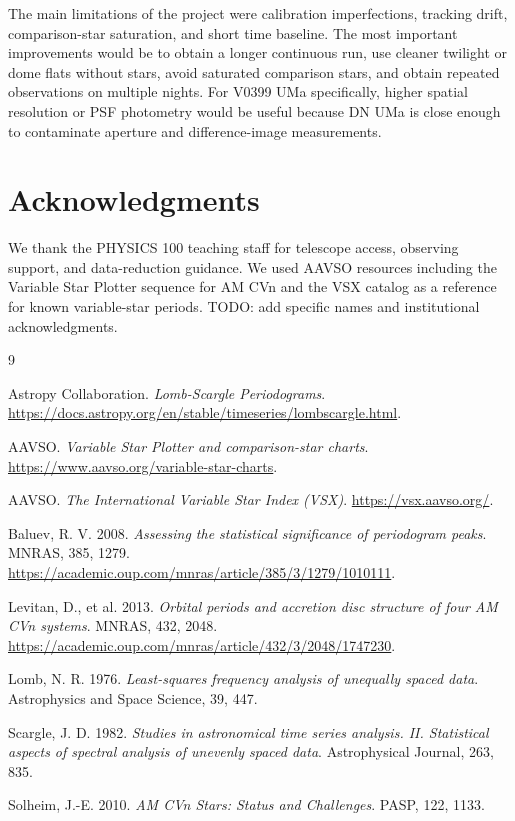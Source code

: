 \documentclass[11pt]{article}
\begin{document}
The main limitations of the project were calibration imperfections, tracking
drift, comparison-star saturation, and short time baseline. The most important
improvements would be to obtain a longer continuous run, use cleaner twilight or
dome flats without stars, avoid saturated comparison stars, and obtain repeated
observations on multiple nights. For V0399 UMa specifically, higher spatial
resolution or PSF photometry would be useful because DN UMa is close enough to
contaminate aperture and difference-image measurements.

\section*{Acknowledgments}

We thank the PHYSICS 100 teaching staff for telescope access, observing support,
and data-reduction guidance. We used AAVSO resources including the Variable Star
Plotter sequence for AM CVn and the VSX catalog as a reference for known
variable-star periods. TODO: add specific names and institutional
acknowledgments.

\begin{thebibliography}{9}

Astropy Collaboration.
\textit{Lomb-Scargle Periodograms}.
\url{https://docs.astropy.org/en/stable/timeseries/lombscargle.html}.

AAVSO.
\textit{Variable Star Plotter and comparison-star charts}.
\url{https://www.aavso.org/variable-star-charts}.

AAVSO.
\textit{The International Variable Star Index (VSX)}.
\url{https://vsx.aavso.org/}.

Baluev, R. V. 2008.
\textit{Assessing the statistical significance of periodogram peaks}.
MNRAS, 385, 1279.
\url{https://academic.oup.com/mnras/article/385/3/1279/1010111}.

Levitan, D., et al. 2013.
\textit{Orbital periods and accretion disc structure of four AM CVn systems}.
MNRAS, 432, 2048.
\url{https://academic.oup.com/mnras/article/432/3/2048/1747230}.

Lomb, N. R. 1976.
\textit{Least-squares frequency analysis of unequally spaced data}.
Astrophysics and Space Science, 39, 447.

Scargle, J. D. 1982.
\textit{Studies in astronomical time series analysis. II. Statistical aspects
of spectral analysis of unevenly spaced data}.
Astrophysical Journal, 263, 835.

Solheim, J.-E. 2010.
\textit{AM CVn Stars: Status and Challenges}.
PASP, 122, 1133.

\end{thebibliography}
\end{document}
